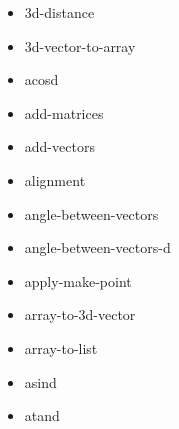 \documentclass [11pt]{book}
\begin{document}
\begin{itemize}

\item {}3d-distance





\item {}3d-vector-to-array





\item {}acosd





\item {}add-matrices





\item {}add-vectors





\item {}alignment





\item {}angle-between-vectors





\item {}angle-between-vectors-d





\item {}apply-make-point





\item {}array-to-3d-vector





\item {}array-to-list





\item {}asind





\item {}atand






\end{itemize}
\end{document}
